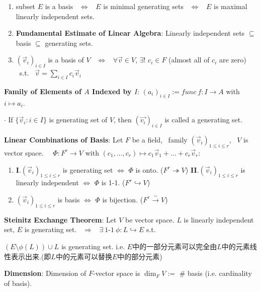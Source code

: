 \documentclass[9pt]{article}
\newcommand{\oto}{\hookrightarrow}
\newcommand{\onto}{\twoheadrightarrow}
\newcommand{\bij}{\stackrel{\sim}{\rightarrow}}
\begin{document}
\begin{enumerate}[itemsep=-2pt, topsep=-2pt]
    \item subset $E$ is a basis \ $\Leftrightarrow$ \ $E$ is minimal generating sets \ $\Leftrightarrow$ \ $E$ is maximal linearly independent sets.
    \item \textbf{Fundamental Estimate of Linear Algebra}: Linearly independent sets $\subseteq$ basis $\subseteq$ generating sets.
    \item $(\vec{v}_i)_{i\in I}$ is a basis of $V$ \ $\Leftrightarrow$ \ $\forall \vec{v}\in V$, $\exists !$ $c_i\in F$ (almost all of $c_i$ are zero) \ s.t. \ $\vec{v}=\sum_{i\in I}c_i\vec{v}_i$
\end{enumerate}

\textbf{Family of Elements of $A$ Indexed by $I$}: $(a_i)_{i\in I}:=func \ f:I\to A$ with $i\mapsto a_i$. 

$\cdot$ If $\{\vec{v}_i:i\in I\}$ is generating set of $V$, then $(\vec{v_i})_{i\in I}$ is called a generating set. \quad {}

\textbf{Linear Combinations of Basis}: Let $F$ be a field, \ family $(\vec{v}_i)_{1\leq i\leq r}$, \ $V$ is vector space. \ \ $\Phi:F^r\to V$ with $(c_1,...,c_r)\mapsto c_1\vec{v}_1+...+c_r\vec{v}_r$:

\begin{enumerate}[itemsep=-2pt, topsep=-2pt]
    \item \textbf{I}.$(\vec{v}_i)_{1\leq i\leq r}$ is generating set $\Leftrightarrow$ $\Phi$ is onto. ($F^r\onto V$) \quad \quad \quad \textbf{II}.$(\vec{v}_i)_{1\leq i\leq r}$ is linearly independent $\Leftrightarrow$ $\Phi$ is 1-1. ($F^r\oto V$)
    \item $(\vec{v}_i)_{1\leq i\leq r}$ is basis $\Leftrightarrow$ $\Phi$ is bijection. ($F^r\bij V$)
\end{enumerate}

\textbf{Steinitz Exchange Theorem}: Let $V$ be vector space. $L$ is linearly independent set, $E$ is generating set. \ $\Rightarrow$ \ $\exists \ \text{1-1} \ \phi:L\oto E$ s.t.

\hspace{130pt} $(E\setminus\phi(L))\cup L$ is generating set. {\tiny i.e. $E$中的一部分元素可以完全由$L$中的元素线性表示出来.(即$L$中的元素可以替换$E$中的部分元素)}

\textbf{Dimension}: Dimension of $F$-vector space is $\dim_FV:=$ \# basis (i.e. cardinality of basis). \quad \quad {}
\end{document}
